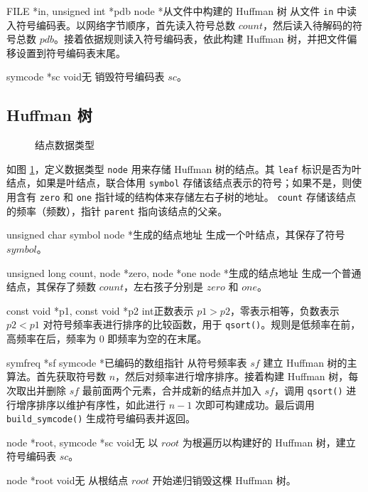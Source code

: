 {FILE *in, unsigned int *pdb}
{node *}{从文件中构建的 Huffman 树}
{从文件 {\tt in} 中读入符号编码表。以网络字节顺序，首先读入符号总数 $count$，然后读入待解码的符号总数 $pdb$。接着依据规则读入符号编码表，依此构建 Huffman 树，并把文件偏移设置到符号编码表末尾。}

{symcode *sc}
{void}{无}
{销毁符号编码表 $sc$。}

\subsection{Huffman 树}

\begin{figure}[htp]
\centering
{}
\caption{\label{node}结点数据类型}
\end{figure}

如图 \ref{node}，定义数据类型 \verb|node| 用来存储 Huffman 树的结点。其 \verb|leaf| 标识是否为叶结点，如果是叶结点，联合体用 \verb|symbol| 存储该结点表示的符号；如果不是，则使用含有 \verb|zero| 和 \verb|one| 指针域的结构体来存储左右子树的地址。
 \verb|count| 存储该结点的频率（频数），指针 \verb|parent| 指向该结点的父亲。

{unsigned char symbol}
{node *}{生成的结点地址}
{生成一个叶结点，其保存了符号 $symbol$。}

{unsigned long count, node *zero, node *one}
{node *}{生成的结点地址}
{生成一个普通结点，其保存了频数 $count$，左右孩子分别是 $zero$ 和 $one$。}

{const void *p1, const void *p2}
{int}{正数表示 $p1 > p2$，零表示相等，负数表示 $p2<p1$}
{对符号频率表进行排序的比较函数，用于 {\tt qsort()}。规则是低频率在前，高频率在后，频率为 0 即频率为空的在末尾。}

{symfreq *sf}
{symcode *}{已编码的数组指针}
{从符号频率表 $sf$ 建立 Huffman 树的主算法。首先获取符号数 $n$，然后对频率进行增序排序。接着构建 Huffman 树，每次取出并删除 $sf$ 最前面两个元素，合并成新的结点并加入 $sf$，调用 {\tt qsort()} 进行增序排序以维护有序性，如此进行 $n-1$ 次即可构建成功。最后调用 {\tt build\_symcode()} 生成符号编码表并返回。}

{node *root, symcode *sc}
{void}{无}
{以 $root$ 为根遍历以构建好的 Huffman 树，建立符号编码表 $sc$。}

{node *root}
{void}{无}
{从根结点 $root$ 开始递归销毁这棵 Huffman 树。}
